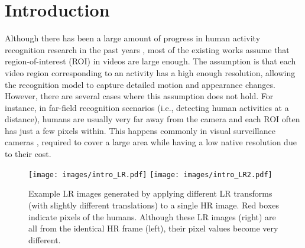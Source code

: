 \documentclass[letterpaper]{article} %
\begin{document}







\section{Introduction}

Although there has been a large amount of progress in human activity recognition research in the past years \cite{ryoo-review,simonyan14,google15,c3d}, most of the existing works assume that region-of-interest (ROI) in videos are large enough. The assumption is that each video region corresponding to an activity has a high enough resolution, allowing the recognition model to capture detailed motion and appearance changes. However, there are several cases where this assumption does not hold. For instance, in far-field recognition scenarios (i.e., detecting human activities at a distance), humans are usually very far away from the camera and each ROI often has just a few pixels within. This happens commonly in visual surveillance cameras \cite{efros2003recognizing,reddy2012human}, required to cover a large area while having a low native resolution due to their cost.


\begin{figure}
\begin{center}
   \texttt{[image: images/intro\_LR.pdf]}
   \texttt{[image: images/intro\_LR2.pdf]}
\end{center}
   \caption{Example LR images generated by applying different LR transforms (with slightly different translations) to a single HR image. Red boxes indicate pixels of the humans. Although these LR images (right) are all from the identical HR frame (left), their pixel values become very different.}
\label{fig:intro}		
\end{figure}
\end{document}
